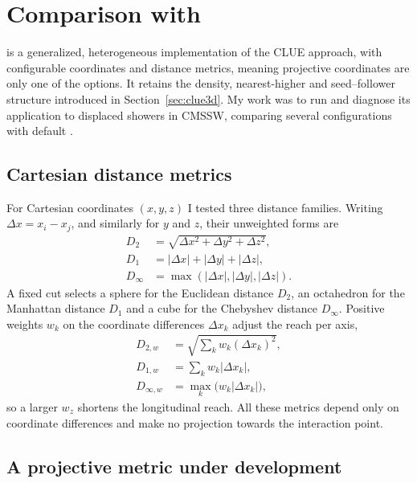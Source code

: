 \section{Comparison with \cluestering{}}
\label{sec:cluestering}

\cluestering{} is a generalized, heterogeneous implementation of the CLUE
approach, with configurable coordinates and distance metrics, meaning projective coordinates are only one of the options. It retains the
density, nearest-higher and seed--follower structure introduced in
Section~\ref{sec:clue3d}. My work was to run and diagnose its application to displaced showers
in CMSSW, comparing several configurations with default \cluethreed{}.

\subsection{Cartesian distance metrics}

For Cartesian coordinates $(x,y,z)$ I tested three distance families. Writing
$\Delta x=x_i-x_j$, and similarly for $y$ and $z$, their unweighted forms are
\begin{align}
 D_2 &= \sqrt{\Delta x^2+\Delta y^2+\Delta z^2},\\
 D_1 &= |\Delta x|+|\Delta y|+|\Delta z|,\\
 D_\infty &= \max(|\Delta x|,|\Delta y|,|\Delta z|).
\end{align}
A fixed cut selects a sphere for the Euclidean distance $D_2$, an octahedron for
the Manhattan distance $D_1$ and a cube for the Chebyshev distance $D_\infty$. Positive weights
$w_k$ on the coordinate differences $\Delta x_k$ adjust the reach per axis,
\begin{align}
 D_{2,w} &= \sqrt{\sum_k w_k(\Delta x_k)^2},\\
 D_{1,w} &= \sum_k w_k|\Delta x_k|,\\
 D_{\infty,w} &= \max_k\bigl(w_k|\Delta x_k|\bigr),
\end{align}
so a larger $w_z$ shortens the longitudinal reach. All these metrics depend only on coordinate
differences and make no projection towards the interaction point.

\subsection{A projective metric under development}

